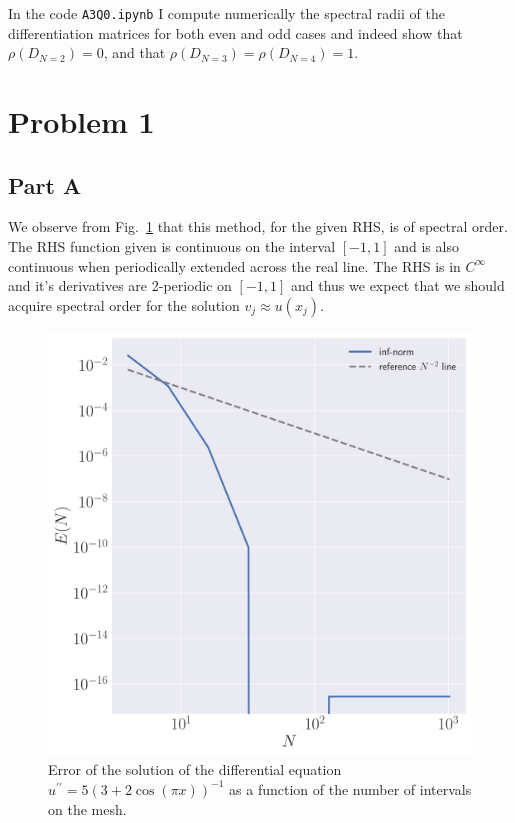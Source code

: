 \documentclass[12pt]{article}
\begin{document}
In the code \verb|A3Q0.ipynb| I compute numerically the spectral radii of the differentiation matrices for both even and odd cases and indeed show that $\rho(D_{N=2}) = 0$, and that $\rho(D_{N=3}) = \rho(D_{N=4}) = 1$.

\section*{Problem 1}

\subsection*{Part A}

We observe from Fig.~\ref{fig:q1a} that this method, for the given RHS, is of spectral order. The RHS function given is continuous on the interval $[-1,1]$ and is also continuous when periodically extended across the real line. The RHS is in $C^{\infty}$ and it's derivatives are 2-periodic on $[-1,1]$ and thus we expect that we should acquire spectral order for the solution $v_{j} \approx u(x_{j})$. 

\begin{figure}[!h]
    \centering
    \includegraphics[clip, scale=0.3]{q1a_fig.pdf}
    \caption{Error of the solution of the differential equation $u^{\prime\prime} = 5\left(3+2\cos(\pi x)\right)^{-1}$ as a function of the number of intervals on the mesh.}
    \label{fig:q1a}
\end{figure}
\end{document}
